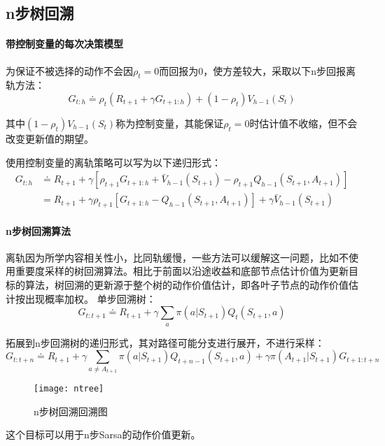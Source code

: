 \documentclass[
12pt, %
a4paper, 
oneside, %
headinclude,footinclude, %
]{scrartcl}
\begin{document}
\subsection{n步树回溯}
\paragraph{带控制变量的每次决策模型}
为保证不被选择的动作不会因$ \rho_t = 0 $而回报为$ 0 $，使方差较大，采取以下n步回报离轨方法：
$$ G_{t:h} \doteq \rho_t (R_{t+1} + \gamma G_{t + 1:h}) + (1 - \rho_t) V_{h - 1}(S_t) $$

其中$ (1 - \rho_t) V_{h - 1}(S_t) $称为控制变量，其能保证$ \rho_t = 0 $时估计值不收缩，但不会改变更新值的期望。

使用控制变量的离轨策略可以写为以下递归形式：
\begin{align*}
G_{t:h} 
&\doteq R_{t + 1} + \gamma[\rho_{t + 1} G_{t + 1:h} + \bar{V}_{h - 1}(S_{t + 1}) - \rho_{t + 1} Q_{h - 1}(S_{t + 1}, A_{t + 1})] \\
&= R_{t + 1} + \gamma \rho_{t + 1}[G_{t + 1:h} - Q_{h - 1}(S_{t + 1}, A_{t + 1})] + \gamma \bar{V}_{h - 1}(S_{t + 1})
\end{align*}
\paragraph{n步树回溯算法}
离轨因为所学内容相关性小，比同轨缓慢，一些方法可以缓解这一问题，比如不使用重要度采样的树回溯算法。相比于前面以沿途收益和底部节点估计价值为更新目标的算法，树回溯的更新源于整个树的动作价值估计，即各叶子节点的动作价值估计按出现概率加权。
单步回溯树：
$$ G_{t:t + 1} \doteq R_{t + 1} + \gamma \sum_{a} \pi(a|S_{t + 1}) Q_t(S_{t + 1}, a) $$

拓展到n步回溯树的递归形式，其对路径可能分支进行展开，不进行采样：
$$ G_{t:t + n} \doteq R_{t + 1} + \gamma \sum_{a \neq A_{t + 1}} \pi(a|S_{t + 1}) Q_{t + n - 1}(S_{t + 1}, a) + \gamma \pi(A_{t + 1}|S_{t + 1}) G_{t + 1:t + n} $$

\begin{figure}[H]
\centering
\texttt{[image: ntree]}
\caption[n步树回溯回溯图]{n步树回溯回溯图}
\end{figure}

这个目标可以用于n步Sarsa的动作价值更新。
\end{document}
